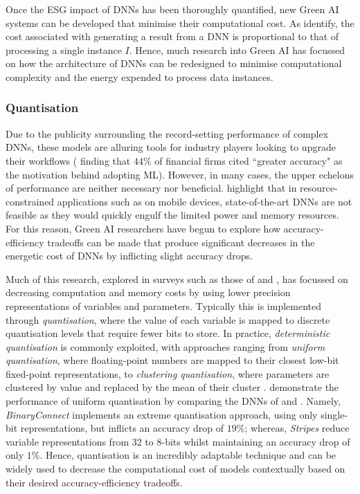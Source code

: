 \documentclass[a4paper, 11pt]{report}
\begin{document}
    Once the ESG impact of DNNs has been thoroughly quantified, new Green AI systems can be developed that minimise their computational cost. As \citet{schwartz-2019} identify, the cost associated with generating a result from a DNN is proportional to that of processing a single instance $I$. Hence, much research into Green AI has focussed on how the architecture of DNNs can be redesigned to minimise computational complexity and the energy expended to process data instances. 


    \subsubsection{Quantisation}
    \label{section: quantisation}

    Due to the publicity surrounding the record-setting performance of complex DNNs, these models are alluring tools for industry players looking to upgrade their workflows (\citet{chartis-2019} finding that $44\%$ of financial firms cited ``greater accuracy" as the motivation behind adopting ML). However, in many cases, the upper echelons of performance are neither necessary nor beneficial. \citet{kumar-2020} highlight that in resource-constrained applications such as on mobile devices, state-of-the-art DNNs are not feasible as they would quickly engulf the limited power and memory resources. For this reason, Green AI researchers have begun to explore how accuracy-efficiency tradeoffs can be made that produce significant decreases in the energetic cost of DNNs by inflicting slight accuracy drops.

    Much of this research, explored in surveys such as those of \citet{xu-2021} and \citet{cai-2022}, has focussed on decreasing computation and memory costs by using lower precision representations of variables and parameters. Typically this is implemented through \emph{quantisation}, where the value of each variable is mapped to discrete quantisation levels that require fewer bits to store. In practice, \emph{deterministic quantisation} is commonly exploited, with approaches ranging from \emph{uniform quantisation}, where floating-point numbers are mapped to their closest low-bit fixed-point representations, to \emph{clustering quantisation}, where parameters are clustered by value and replaced by the mean of their cluster \citep{xu-2021}. \citet{kumar-2020} demonstrate the performance of uniform quantisation by comparing the DNNs of \citet{courbariaux-2015} and \citet{judd-2016}. Namely, \emph{BinaryConnect} \citep{courbariaux-2015} implements an extreme quantisation approach, using only single-bit representations, but inflicts an accuracy drop of $19\%$; whereas, \emph{Stripes} \citep{judd-2016} reduce variable representations from 32 to 8-bits whilst maintaining an accuracy drop of only $1\%$. Hence, quantisation is an incredibly adaptable technique and can be widely used to decrease the computational cost of models contextually based on their desired accuracy-efficiency tradeoffs.
\end{document}
